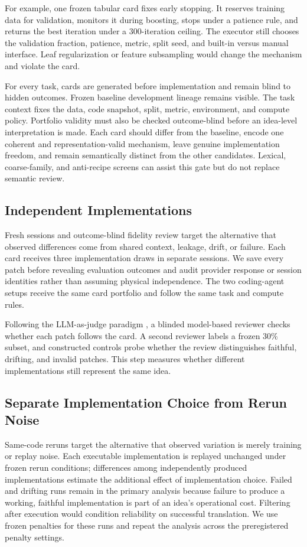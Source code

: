 \documentclass[letterpaper]{article}
\begin{document}
For example, one frozen tabular card fixes early stopping. It reserves training data for validation, monitors it during boosting, stops under a patience rule, and returns the best iteration under a 300-iteration ceiling. The executor still chooses the validation fraction, patience, metric, split seed, and built-in versus manual interface. Leaf regularization or feature subsampling would change the mechanism and violate the card.

For every task, cards are generated before implementation and remain blind to hidden outcomes. Frozen baseline development lineage remains visible. The task context fixes the data, code snapshot, split, metric, environment, and compute policy. Portfolio validity must also be checked outcome-blind before an idea-level interpretation is made. Each card should differ from the baseline, encode one coherent and representation-valid mechanism, leave genuine implementation freedom, and remain semantically distinct from the other candidates. Lexical, coarse-family, and anti-recipe screens can assist this gate but do not replace semantic review.

\subsection{Independent Implementations}

Fresh sessions and outcome-blind fidelity review target the alternative that observed differences come from shared context, leakage, drift, or failure. Each card receives three implementation draws in separate sessions. We save every patch before revealing evaluation outcomes and audit provider response or session identities rather than assuming physical independence. The two coding-agent setups receive the same card portfolio and follow the same task and compute rules.

Following the LLM-as-judge paradigm \cite{zheng2023judge}, a blinded model-based reviewer checks whether each patch follows the card. A second reviewer labels a frozen 30\% subset, and constructed controls probe whether the review distinguishes faithful, drifting, and invalid patches. This step measures whether different implementations still represent the same idea.

\subsection{Separate Implementation Choice from Rerun Noise}

Same-code reruns target the alternative that observed variation is merely training or replay noise. Each executable implementation is replayed unchanged under frozen rerun conditions; differences among independently produced implementations estimate the additional effect of implementation choice. Failed and drifting runs remain in the primary analysis because failure to produce a working, faithful implementation is part of an idea's operational cost. Filtering after execution would condition reliability on successful translation. We use frozen penalties for these runs and repeat the analysis across the preregistered penalty settings.
\end{document}
